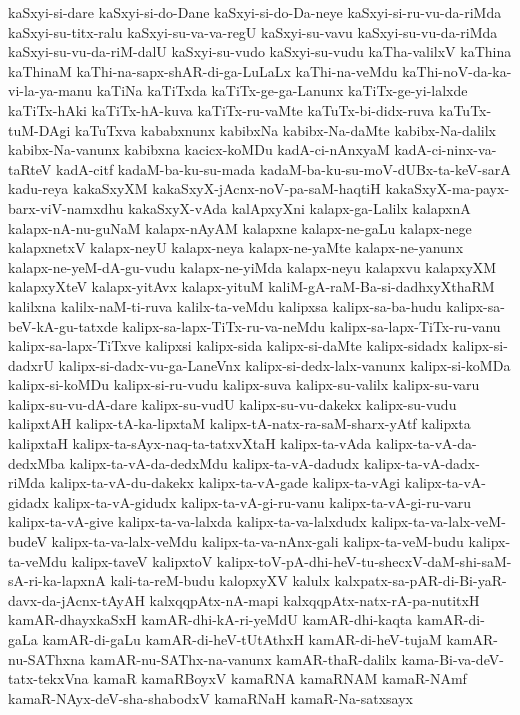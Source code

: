 {kaSxyi-si-dare
kaSxyi-si-do-Dane
kaSxyi-si-do-Da-neye
kaSxyi-si-ru-vu-da-riMda
kaSxyi-su-titx-ralu
kaSxyi-su-va-va-regU
kaSxyi-su-vavu
kaSxyi-su-vu-da-riMda
kaSxyi-su-vu-da-riM-dalU
kaSxyi-su-vudo
kaSxyi-su-vudu
kaTha-valilxV
kaThina
kaThinaM
kaThi-na-sapx-shAR-di-ga-LuLaLx
kaThi-na-veMdu
kaThi-noV-da-ka-vi-la-ya-manu
kaTiNa
kaTiTxda
kaTiTx-ge-ga-Lanunx
kaTiTx-ge-yi-lalxde
kaTiTx-hAki
kaTiTx-hA-kuva
kaTiTx-ru-vaMte
kaTuTx-bi-didx-ruva
kaTuTx-tuM-DAgi
kaTuTxva
kababxnunx
kabibxNa
kabibx-Na-daMte
kabibx-Na-dalilx
kabibx-Na-vanunx
kabibxna
kacicx-koMDu
kadA-ci-nAnxyaM
kadA-ci-ninx-va-taRteV
kadA-citf
kadaM-ba-ku-su-mada
kadaM-ba-ku-su-moV-dUBx-ta-keV-sarA
kadu-reya
kakaSxyXM
kakaSxyX-jAcnx-noV-pa-saM-haqtiH
kakaSxyX-ma-payx-barx-viV-namxdhu
kakaSxyX-vAda
kalApxyXni
kalapx-ga-Lalilx
kalapxnA
kalapx-nA-nu-guNaM
kalapx-nAyAM
kalapxne
kalapx-ne-gaLu
kalapx-nege
kalapxnetxV
kalapx-neyU
kalapx-neya
kalapx-ne-yaMte
kalapx-ne-yanunx
kalapx-ne-yeM-dA-gu-vudu
kalapx-ne-yiMda
kalapx-neyu
kalapxvu
kalapxyXM
kalapxyXteV
kalapx-yitAvx
kalapx-yituM
kaliM-gA-raM-Ba-si-dadhxyXthaRM
kalilxna
kalilx-naM-ti-ruva
kalilx-ta-veMdu
kalipxsa
kalipx-sa-ba-hudu
kalipx-sa-beV-kA-gu-tatxde
kalipx-sa-lapx-TiTx-ru-va-neMdu
kalipx-sa-lapx-TiTx-ru-vanu
kalipx-sa-lapx-TiTxve
kalipxsi
kalipx-sida
kalipx-si-daMte
kalipx-sidadx
kalipx-si-dadxrU
kalipx-si-dadx-vu-ga-LaneVnx
kalipx-si-dedx-lalx-vanunx
kalipx-si-koMDa
kalipx-si-koMDu
kalipx-si-ru-vudu
kalipx-suva
kalipx-su-valilx
kalipx-su-varu
kalipx-su-vu-dA-dare
kalipx-su-vudU
kalipx-su-vu-dakekx
kalipx-su-vudu
kalipxtAH
kalipx-tA-ka-lipxtaM
kalipx-tA-natx-ra-saM-sharx-yAtf
kalipxta
kalipxtaH
kalipx-ta-sAyx-naq-ta-tatxvXtaH
kalipx-ta-vAda
kalipx-ta-vA-da-dedxMba
kalipx-ta-vA-da-dedxMdu
kalipx-ta-vA-dadudx
kalipx-ta-vA-dadx-riMda
kalipx-ta-vA-du-dakekx
kalipx-ta-vA-gade
kalipx-ta-vAgi
kalipx-ta-vA-gidadx
kalipx-ta-vA-gidudx
kalipx-ta-vA-gi-ru-vanu
kalipx-ta-vA-gi-ru-varu
kalipx-ta-vA-give
kalipx-ta-va-lalxda
kalipx-ta-va-lalxdudx
kalipx-ta-va-lalx-veM-budeV
kalipx-ta-va-lalx-veMdu
kalipx-ta-va-nAnx-gali
kalipx-ta-veM-budu
kalipx-ta-veMdu
kalipx-taveV
kalipxtoV
kalipx-toV-pA-dhi-heV-tu-shecxV-daM-shi-saM-sA-ri-ka-lapxnA
kali-ta-reM-budu
kalopxyXV
kalulx
kalxpatx-sa-pAR-di-Bi-yaR-davx-da-jAcnx-tAyAH
kalxqqpAtx-nA-mapi
kalxqqpAtx-natx-rA-pa-nutitxH
kamAR-dhayxkaSxH
kamAR-dhi-kA-ri-yeMdU
kamAR-dhi-kaqta
kamAR-di-gaLa
kamAR-di-gaLu
kamAR-di-heV-tUtAthxH
kamAR-di-heV-tujaM
kamAR-nu-SAThxna
kamAR-nu-SAThx-na-vanunx
kamAR-thaR-dalilx
kama-Bi-va-deV-tatx-tekxVna
kamaR
kamaRBoyxV
kamaRNA
kamaRNAM
kamaR-NAmf
kamaR-NAyx-deV-sha-shabodxV
kamaRNaH
kamaR-Na-satxsayx
}
